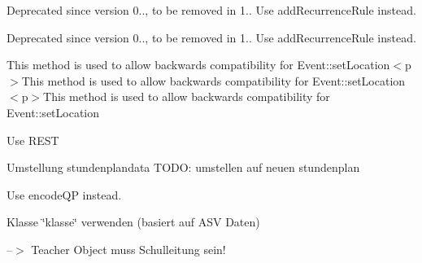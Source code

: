 \begin{DoxyRefList}
Deprecated since version 0.., to be removed in 1.. Use add\+Recurrence\+Rule instead.

Deprecated since version 0.., to be removed in 1.. Use add\+Recurrence\+Rule instead. 
\item[\label{deprecated__deprecated000007}%
\Hypertarget{deprecated__deprecated000007}%
Element \mbox{\hyperlink{class_eluceo_1_1i_cal_1_1_property_1_1_event_1_1_geo_a8610d5433703bb05b2f1e48a44b93a81}{Eluceo\+:\+:from\+String}} (string \$geo\+Location\+String)]This method is used to allow backwards compatibility for Event\+::set\+Location$<$p$>$This method is used to allow backwards compatibility for Event\+::set\+Location$<$p$>$This method is used to allow backwards compatibility for Event\+::set\+Location 
\item[\label{deprecated__deprecated000001}%
\Hypertarget{deprecated__deprecated000001}%
Klasse \mbox{\hyperlink{class_get_school_data}{Get\+School\+Data}} ]Use R\+E\+ST  
\item[\label{deprecated__deprecated000014}%
\Hypertarget{deprecated__deprecated000014}%
Element \mbox{\hyperlink{classgrade_aff8e296e9340096f5b67eee893570a43}{grade\+:\+:get\+All\+Grades\+Stundenplan}} ()]Umstellung stundenplandata T\+O\+DO\+: umstellen auf neuen stundenplan  
\item[\label{deprecated__deprecated000040}%
\Hypertarget{deprecated__deprecated000040}%
Klasse \mbox{\hyperlink{classjson_api}{json\+Api}} ]
\item[\label{deprecated__deprecated000021}%
\Hypertarget{deprecated__deprecated000021}%
Element \mbox{\hyperlink{class_p_h_p_mailer_ad067c5c7e93929bf4d0a5d46bc422aef}{P\+H\+P\+Mailer\+:\+:encode\+Q\+Pphp}} ( \$string, \$line\+\_\+max=76, \$space\+\_\+conv=false)]Use encode\+QP instead.  
\item[\label{deprecated__deprecated000041}%
\Hypertarget{deprecated__deprecated000041}%
Klasse \mbox{\hyperlink{classprojektverwaltung}{projektverwaltung}} ]
\item[\label{deprecated__deprecated000015}%
\Hypertarget{deprecated__deprecated000015}%
Element \mbox{\hyperlink{classpupil_a6d1d7427110a0af2dcb9c5c7ea6db740}{pupil\+:\+:get\+Users\+Of\+Grade}} (\$grade)]Klasse \char`\"{}klasse\char`\"{} verwenden (basiert auf A\+SV Daten)  
\item[\label{deprecated__deprecated000016}%
\Hypertarget{deprecated__deprecated000016}%
Element \mbox{\hyperlink{classsession_a1e5cf401d45d01cc32e1eeb2aae6ef8e}{session\+:\+:is\+Schulleitung}} ()]--$>$ Teacher Object muss Schulleitung sein!  

\end{DoxyRefList}

